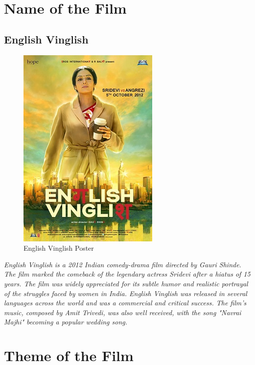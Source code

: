 \documentclass[11pt]{article}
\begin{document}
\tableofcontents
\thispagestyle{empty}
\clearpage

\setcounter{page}{1}


\section{Name of the Film}

\subsection*{English Vinglish}

\begin{figure}[H]
    \centering
    \includegraphics[width=.45\textwidth]{English_Vinglish_poster.jpg}
    \caption{English Vinglish Poster}
\end{figure}
\textit{English Vinglish is a 2012 Indian comedy-drama film directed by Gauri Shinde. The film marked the comeback of the legendary actress Sridevi after a hiatus of 15 years. The film was widely appreciated for its subtle humor and realistic portrayal of the struggles faced by women in India. English Vinglish was released in several languages across the world and was a commercial and critical success. The film's music, composed by Amit Trivedi, was also well received, with the song "Navrai Majhi" becoming a popular wedding song.}


\section{Theme of the Film}
\end{document}
